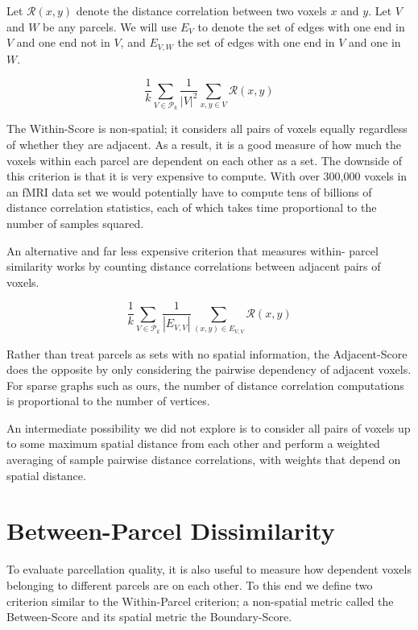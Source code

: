 Let $\mathcal{R}(x,y)$ denote the distance correlation between two
voxels $x$ and $y$.
Let $V$ and $W$ be any parcels. We will use $E_V$ to denote the set of edges with one end in $V$ and one end not in $V$, and $E_{V,W}$ the set
of edges with one end in $V$ and one in $W$.

\begin{definition} \label{within-score}
\[ \frac{1}{k} \sum_{V \in \mathcal{P}_k}
   \frac{1}{|V|^2} \sum_{x,y \in V} \mathcal{R}(x,y)
\]
\end{definition}

The Within-Score is non-spatial; it considers all pairs of voxels
equally regardless of whether they are adjacent. As a result, it is a
good measure of how much the voxels within each parcel are dependent on
each other as a set. The downside of this criterion is that it is very
expensive to compute. With over 300,000 voxels in an fMRI data set we
would potentially have to compute tens of billions of distance
correlation statistics, each of which takes time proportional to the
number of samples squared.

An alternative and far less expensive criterion that measures within-
parcel similarity works by counting distance correlations between
adjacent pairs of voxels.

\begin{definition} \label{adjacent-score}
\[ \frac{1}{k} \sum_{V \in \mathcal{P}_k}
   \frac{1}{|E_{V,V}|} \sum_{(x,y) \in E_{V,V}} \mathcal{R}(x,y)
\]
\end{definition}

Rather than treat parcels as sets with no spatial information, the
Adjacent-Score does the opposite by only considering the pairwise
dependency of adjacent voxels. For sparse graphs such as ours, the number
of distance correlation computations is proportional to the number of
vertices.

An intermediate possibility we did not explore is to consider all pairs
of voxels up to some maximum spatial distance from each other and
perform a weighted averaging of sample pairwise distance correlations,
with weights that depend on spatial distance.

\section{Between-Parcel Dissimilarity}

To evaluate parcellation quality, it is also useful to measure how
dependent voxels belonging to different parcels are on each other. To
this end we define two criterion similar to the Within-Parcel criterion;
a non-spatial metric called the Between-Score and its spatial metric
the Boundary-Score.

